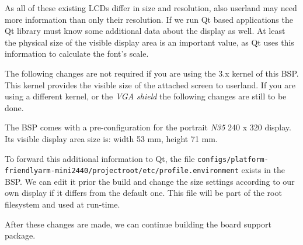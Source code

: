 As all of these existing LCDs differ in size and resolution, also userland may
need more information than only their resolution. If we run Qt based applications
the Qt library must know some additional data about the display as well. At
least the physical size of the visible display area is an important value, as
Qt uses this information to calculate the font's scale.

\begin{important}
The following changes are not required if you are using the 3.x kernel of
this BSP. This kernel provides the visible size of the attached screen to userland.
If you are using a different kernel, or the \textit{VGA shield} the following changes
are still to be done.
\end{important}

The BSP comes with a pre-configuration for the portrait \textit{N35}
240 x 320 display. Its visible display area size is: width 53 mm, height 71 mm.

To forward this additional information to Qt, the file
\texttt{configs/platform-friendlyarm-mini2440/projectroot/etc/profile.environment}
exists in the BSP. We can edit it prior the build and change the size settings
according to our own display if it differs from the default one. This file will
be part of the root filesystem and used at run-time.

After these changes are made, we can continue building the board support
package.

